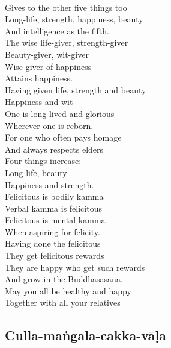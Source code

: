 \begin{english-verses}
  \\
  Gives to the other five things too\\
  Long-life, strength, happiness, beauty\\
  And intelligence as the fifth.\\
  The wise life-giver, strength-giver\\
  Beauty-giver, wit-giver\\
  Wise giver of happiness\\
  Attains happiness.\\
  Having given life, strength and beauty\\
  Happiness and wit\\
  One is long-lived and glorious\\
  Wherever one is reborn.\\
  For one who often pays homage\\
  And always respects elders\\
  Four things increase:\\
  Long-life, beauty\\
  Happiness and strength.\\
  Felicitous is bodily kamma\\
  Verbal kamma is felicitous\\
  Felicitous is mental kamma\\
  When aspiring for felicity.\\
  Having done the felicitous\\
  They get felicitous rewards\\
  They are happy who get such rewards\\
  And grow in the Buddhasāsana.\\
  May you all be healthy and happy\\
  Together with all your relatives
\end{english-verses}

\suttaRef{[AN 5.37 / Dhp 109 / AN 3.155]}

\subsection{Culla-maṅgala-cakka-vāḷa}
\label{culla-mangala-cakka-vala}

